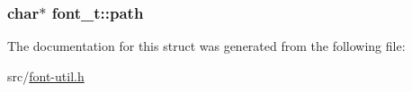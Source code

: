 \subsubsection[{path}]{\setlength{\rightskip}{0pt plus 5cm}char$\ast$ font\+\_\+t\+::path}\label{structfont__t_a5e3dd9dc422392492027e5c3e598898a}


The documentation for this struct was generated from the following file\+:\begin{DoxyCompactItemize}
\item 
src/\hyperlink{font-util_8h}{font-\/util.\+h}\end{DoxyCompactItemize}
